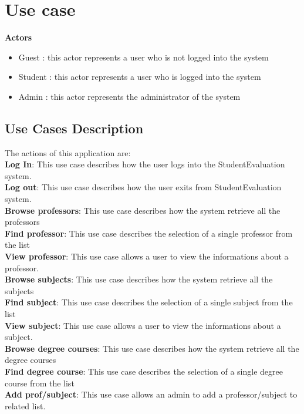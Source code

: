 \documentclass[a4paper, oneside]{article}
\begin{document}
\clearpage

\section{Use case}

\textbf{Actors}
\begin{itemize}
\item{Guest : this actor represents a user who is not logged into the system}
\item{Student : this actor represents a user who is logged into the system}
\item{Admin : this actor represents the administrator of the system}
\end{itemize}

\subsection{Use Cases Description}
The actions of this application are:\\
\textbf{Log In}: This use case describes how the user logs into the StudentEvaluation system.\\
\textbf{Log out}: This use case describes how the user exits from StudentEvaluation system.\\
\textbf{Browse professors}: This use case describes how the system retrieve all the professors\\
\textbf{Find professor}: This use case describes the selection of a single professor from the list\\
\textbf{View professor}: This use case allows a user to view the informations about a professor.\\
\textbf{Browse subjects}: This use case describes how the system retrieve all the subjects\\
\textbf{Find subject}: This use case describes the selection of a single subject from the list\\
\textbf{View subject}: This use case allows a user to view the informations about a subject.\\
\textbf{Browse degree courses}: This use case describes how the system retrieve all the degree courses\\
\textbf{Find degree course}: This use case describes the selection of a single degree course from the list\\
\textbf{Add prof/subject}: This use case allows an admin to add a professor/subject to related list.\\
\end{document}
